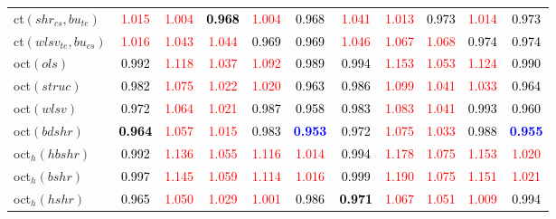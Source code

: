 \begin{tabular}[t]{l|>{}cccc>{}c|ccccc}
ct$(shr_{cs}, bu_{te})$ & \textcolor{red}{1.015} & \textcolor{red}{1.004} & \textcolor{black}{\textbf{0.968}} & \textcolor{red}{1.004} & \textcolor{black}{0.968} & \textcolor{red}{1.041} & \textcolor{red}{1.013} & \textcolor{black}{0.973} & \textcolor{red}{1.014} & \textcolor{black}{0.973}\\
ct$(wlsv_{te}, bu_{cs})$ & \textcolor{red}{1.016} & \textcolor{red}{1.043} & \textcolor{red}{1.044} & \textcolor{black}{0.969} & \textcolor{black}{0.969} & \textcolor{red}{1.046} & \textcolor{red}{1.067} & \textcolor{red}{1.068} & \textcolor{black}{0.974} & \textcolor{black}{0.974}\\
oct$(ols)$ & \textcolor{black}{0.992} & \textcolor{red}{1.118} & \textcolor{red}{1.037} & \textcolor{red}{1.092} & \textcolor{black}{0.989} & \textcolor{black}{0.994} & \textcolor{red}{1.153} & \textcolor{red}{1.053} & \textcolor{red}{1.124} & \textcolor{black}{0.990}\\
oct$(struc)$ & \textcolor{black}{0.982} & \textcolor{red}{1.075} & \textcolor{red}{1.022} & \textcolor{red}{1.020} & \textcolor{black}{0.963} & \textcolor{black}{0.986} & \textcolor{red}{1.099} & \textcolor{red}{1.041} & \textcolor{red}{1.033} & \textcolor{black}{0.964}\\
oct$(wlsv)$ & \textcolor{black}{0.972} & \textcolor{red}{1.064} & \textcolor{red}{1.021} & \textcolor{black}{0.987} & \textcolor{black}{0.958} & \textcolor{black}{0.983} & \textcolor{red}{1.083} & \textcolor{red}{1.041} & \textcolor{black}{0.993} & \textcolor{black}{0.960}\\
oct$(bdshr)$ & \textcolor{black}{\textbf{0.964}} & \textcolor{red}{1.057} & \textcolor{red}{1.015} & \textcolor{black}{0.983} & \textcolor{blue}{\textbf{0.953}} & \textcolor{black}{0.972} & \textcolor{red}{1.075} & \textcolor{red}{1.033} & \textcolor{black}{0.988} & \textcolor{blue}{\textbf{0.955}}\\
oct$_h(hbshr)$ & \textcolor{black}{0.992} & \textcolor{red}{1.136} & \textcolor{red}{1.055} & \textcolor{red}{1.116} & \textcolor{red}{1.014} & \textcolor{black}{0.994} & \textcolor{red}{1.178} & \textcolor{red}{1.075} & \textcolor{red}{1.153} & \textcolor{red}{1.020}\\
oct$_h(bshr)$ & \textcolor{black}{0.997} & \textcolor{red}{1.145} & \textcolor{red}{1.059} & \textcolor{red}{1.114} & \textcolor{red}{1.016} & \textcolor{black}{0.999} & \textcolor{red}{1.190} & \textcolor{red}{1.075} & \textcolor{red}{1.151} & \textcolor{red}{1.021}\\
oct$_h(hshr)$ & \textcolor{black}{0.965} & \textcolor{red}{1.050} & \textcolor{red}{1.029} & \textcolor{red}{1.001} & \textcolor{black}{0.986} & \textcolor{black}{\textbf{0.971}} & \textcolor{red}{1.067} & \textcolor{red}{1.051} & \textcolor{red}{1.009} & \textcolor{black}{0.994}\\

\end{tabular}
